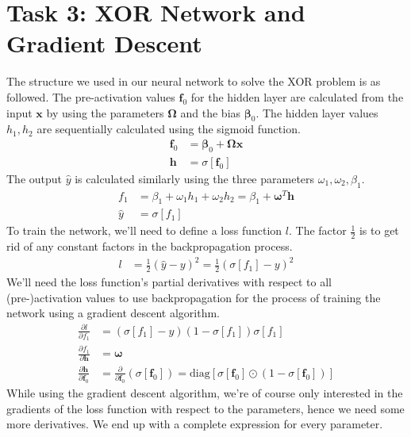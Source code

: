 \documentclass{article} %
\begin{document}
\section{Task 3: XOR Network and Gradient Descent}
The structure we used in our neural network to solve the XOR problem is as followed. The pre-activation values $\mathbf{f}_0$ for the hidden layer are calculated from the input $\mathbf{x}$ by using the parameters $\boldsymbol{\Omega}$ and the bias $\boldsymbol{\beta}_0$. The hidden layer values $h_1,h_2$ are sequentially calculated using the sigmoid function. 
\begin{align*}
    \mathbf{f}_0 &= \boldsymbol{\beta}_0 + \boldsymbol{\Omega}\mathbf{x} \\    
    \mathbf{h} &= \sigma[\mathbf{f}_0]
\end{align*}
The output $\hat{y}$ is calculated similarly using the three parameters $\omega_1, \omega_2, \beta_1$. 
\begin{align*}
    f_1 &= \beta_1 + \omega_1h_1 + \omega_2h_2 = \beta_1 + \boldsymbol{\omega}^T\mathbf{h} \\
    \hat{y} &= \sigma[f_1]
\end{align*}
To train the network, we'll need to define a loss function $l$. The factor $\tfrac{1}{2}$ is to get rid of any constant factors in the backpropagation process.
\begin{align*}
    l &= \tfrac{1}{2}(\hat{y} - y)^2 = \tfrac{1}{2}(\sigma[f_1]-y)^2 
\end{align*}
We'll need the loss function's partial derivatives with respect to all (pre-)activation values to use backpropagation for the process of training the network using a gradient descent  algorithm.
\begin{align*}
    \tfrac{\partial l}{\partial f_1} &= (\sigma[f_1] - y)(1 - \sigma[f_1])\sigma[f_1] \\
    \tfrac{\partial f_1}{\partial \mathbf{h}} &= \boldsymbol{\omega} \\
    \tfrac{\partial \mathbf{h}}{\partial \mathbf{f}_0} &= \tfrac{\partial}{\partial \mathbf{f}_0} (\sigma[\mathbf{f}_0]) = \mathrm{diag}[\sigma[\mathbf{f}_0]\odot(1-\sigma[\mathbf{f}_0])] 
\end{align*}
While using the gradient descent algorithm, we're of course only interested in the gradients of the loss function with respect to the parameters, hence we need some more derivatives. We end up with a complete expression for every parameter.
\end{document}
